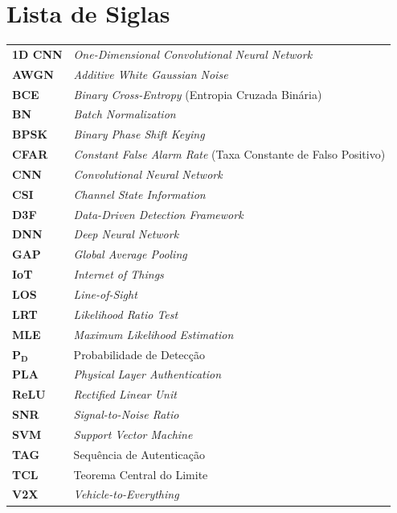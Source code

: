 \documentclass[12pt,a4paper]{article}
\begin{document}
\section*{Lista de Siglas}
{\small
\begin{tabular}{@{}p{1.9cm}p{5.9cm}@{}}
\textbf{1D CNN}    & \textit{One-Dimensional Convolutional Neural Network} \\
\textbf{AWGN}      & \textit{Additive White Gaussian Noise} \\
\textbf{BCE}       & \textit{Binary Cross-Entropy} (Entropia Cruzada Binária) \\
\textbf{BN}        & \textit{Batch Normalization} \\
\textbf{BPSK}      & \textit{Binary Phase Shift Keying} \\
\textbf{CFAR}      & \textit{Constant False Alarm Rate} (Taxa Constante de Falso Positivo) \\
\textbf{CNN}       & \textit{Convolutional Neural Network} \\
\textbf{CSI}       & \textit{Channel State Information} \\
\textbf{D3F}       & \textit{Data-Driven Detection Framework}~\cite{ref_braca} \\
\textbf{DNN}       & \textit{Deep Neural Network} \\
\textbf{GAP}       & \textit{Global Average Pooling} \\
\textbf{IoT}       & \textit{Internet of Things} \\
\textbf{LOS}       & \textit{Line-of-Sight} \\
\textbf{LRT}       & \textit{Likelihood Ratio Test} \\
\textbf{MLE}       & \textit{Maximum Likelihood Estimation} \\
$\boldsymbol{P_D}$ & Probabilidade de Detecção \\
\textbf{PLA}       & \textit{Physical Layer Authentication} \\
\textbf{ReLU}      & \textit{Rectified Linear Unit} \\
\textbf{SNR}       & \textit{Signal-to-Noise Ratio} \\
\textbf{SVM}       & \textit{Support Vector Machine} \\
\textbf{TAG}       & Sequência de Autenticação \\
\textbf{TCL}       & Teorema Central do Limite \\
\textbf{V2X}       & \textit{Vehicle-to-Everything} \\
\end{tabular}
}
\end{document}
